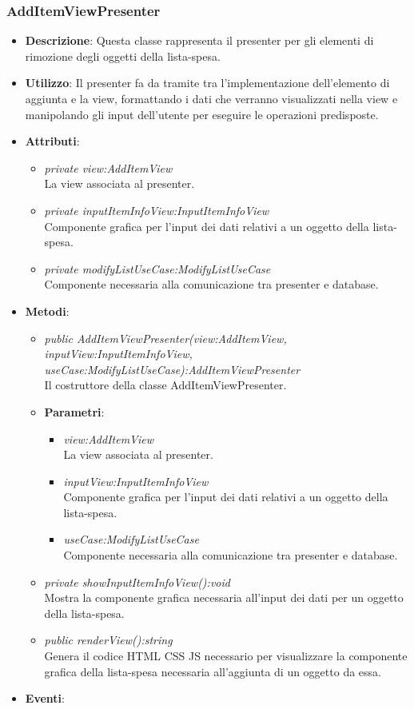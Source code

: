 \subsubsection{AddItemViewPresenter}
\begin{itemize}
\item \textbf{Descrizione}: Questa classe rappresenta il presenter per gli elementi di rimozione degli oggetti  della lista-spesa.
\item \textbf{Utilizzo}: Il presenter fa da tramite tra l'implementazione dell'elemento di aggiunta e la view, formattando i dati che verranno visualizzati nella view e manipolando gli input dell'utente per eseguire le operazioni predisposte.
\item \textbf{Attributi}: 
	\begin{itemize}
	\item \textit{private view:AddItemView}\\
	La view associata al presenter.
	\item \textit{private inputItemInfoView:InputItemInfoView}\\
	Componente grafica per l'input dei dati relativi a un oggetto della lista-spesa.
	\item \textit{private modifyListUseCase:ModifyListUseCase}\\
	Componente necessaria alla comunicazione tra presenter e database.
	\end{itemize}
\item \textbf{Metodi}:
	\begin{itemize}
	\item \textit{public AddItemViewPresenter(view:AddItemView, inputView:InputItemInfoView, useCase:ModifyListUseCase):AddItemViewPresenter}\\
	Il costruttore della classe AddItemViewPresenter.	
		\item{\textbf{Parametri}: \begin{itemize}
		\item \textit{view:AddItemView}\\
			La view associata al presenter.
		\item \textit{inputView:InputItemInfoView}\\
			Componente grafica per l'input dei dati relativi a un oggetto della lista-spesa.
		\item \textit{useCase:ModifyListUseCase}\\
			Componente necessaria alla comunicazione tra presenter e database.
		\end{itemize}}
	\item \textit{private showInputItemInfoView():void}\\
	Mostra la componente grafica necessaria all'input dei dati per un oggetto della lista-spesa.
	\item \textit{public renderView():string}\\
	Genera il codice HTML CSS JS necessario per visualizzare la componente grafica della lista-spesa necessaria all'aggiunta di un oggetto da essa.
	\end{itemize}
\item \textbf{Eventi}:
\end{itemize}

